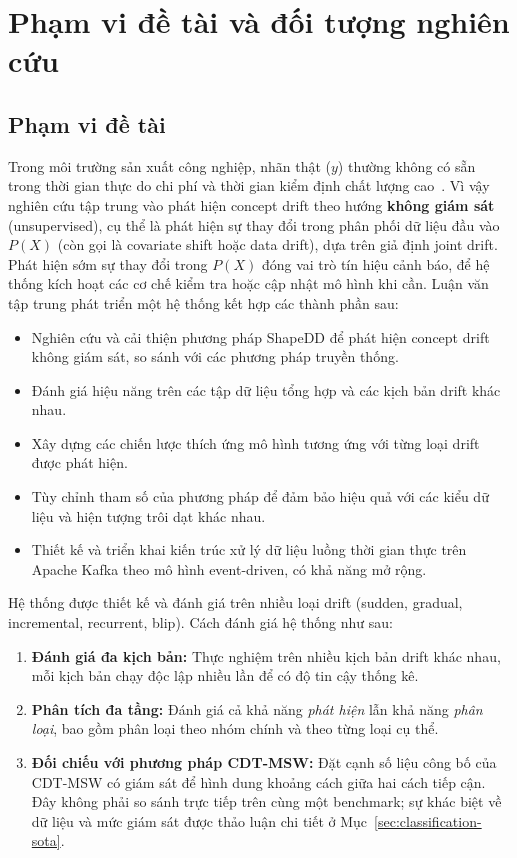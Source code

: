 \section{Phạm vi đề tài và đối tượng nghiên cứu}
\subsection{Phạm vi đề tài}
Trong môi trường sản xuất công nghiệp, nhãn thật ($y$) thường không có sẵn trong thời gian thực do chi phí và thời gian kiểm định chất lượng cao~\cite{jourdan2023process}. Vì vậy nghiên cứu tập trung vào phát hiện concept drift theo hướng \textbf{không giám sát} (unsupervised), cụ thể là phát hiện sự thay đổi trong phân phối dữ liệu đầu vào $P(X)$ (còn gọi là covariate shift hoặc data drift), dựa trên giả định joint drift. Phát hiện sớm sự thay đổi trong $P(X)$ đóng vai trò tín hiệu cảnh báo, để hệ thống kích hoạt các cơ chế kiểm tra hoặc cập nhật mô hình khi cần.
Luận văn tập trung phát triển một hệ thống kết hợp các thành phần sau:
\begin{itemize}
	\item Nghiên cứu và cải thiện phương pháp ShapeDD để phát hiện concept drift không giám sát, so sánh với các phương pháp truyền thống.
	\item Đánh giá hiệu năng trên các tập dữ liệu tổng hợp và các kịch bản drift khác nhau.
	\item Xây dựng các chiến lược thích ứng mô hình tương ứng với từng loại drift được phát hiện.
	\item Tùy chỉnh tham số của phương pháp để đảm bảo hiệu quả với các kiểu dữ liệu và hiện tượng trôi dạt khác nhau.
	\item Thiết kế và triển khai kiến trúc xử lý dữ liệu luồng thời gian thực trên Apache Kafka theo mô hình event-driven, có khả năng mở rộng.
\end{itemize}

Hệ thống được thiết kế và đánh giá trên nhiều loại drift (sudden, gradual, incremental, recurrent, blip). Cách đánh giá hệ thống như sau:
\begin{enumerate}
	\item \textbf{Đánh giá đa kịch bản:} Thực nghiệm trên nhiều kịch bản drift khác nhau, mỗi kịch bản chạy độc lập nhiều lần để có độ tin cậy thống kê.
	\item \textbf{Phân tích đa tầng:} Đánh giá cả khả năng \textit{phát hiện} lẫn khả năng \textit{phân loại}, bao gồm phân loại theo nhóm chính và theo từng loại cụ thể.
	\item \textbf{Đối chiếu với phương pháp CDT-MSW:} Đặt cạnh số liệu công bố của CDT-MSW có giám sát để hình dung khoảng cách giữa hai cách tiếp cận. Đây không phải so sánh trực tiếp trên cùng một benchmark; sự khác biệt về dữ liệu và mức giám sát được thảo luận chi tiết ở Mục~\ref{sec:classification-sota}.
\end{enumerate}

